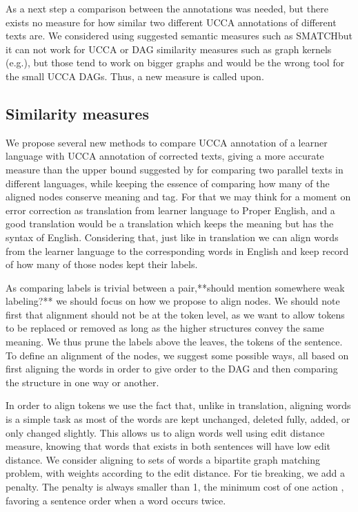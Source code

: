\documentclass[english]{article}
\begin{document}
As a next step a comparison between the annotations was needed, but
there exists no measure for how similar two different UCCA annotations
of different texts are. We considered using suggested semantic measures
such as SMATCH\cite{cai2013smatch}but it can not work for UCCA or
DAG similarity measures such as graph kernels (e.g.\cite{kashima2003marginalized}),
but those tend to work on bigger graphs and would be the wrong tool
for the small UCCA DAGs. Thus, a new measure is called upon.

\subsection{Similarity measures\label{subsec:Similarity-measures}}

We propose several new methods to compare UCCA annotation of a learner\\
language with UCCA annotation of corrected texts, giving a more accurate
measure than the upper bound suggested by \cite{sulem2015conceptual}for
comparing two parallel texts in different languages, while keeping
the essence of comparing how many of the aligned nodes conserve meaning
and tag. For that we may think for a moment on error correction as
translation from learner language to Proper English, and a good translation
would be a translation which keeps the meaning but has the syntax
of English. Considering that, just like in translation we can align
words from the learner language to the corresponding words in English
and keep record of how many of those nodes kept their labels.

As comparing labels is trivial between a pair,{*}{*}should mention
somewhere weak labeling?{*}{*} we should focus on how we propose to
align nodes. We should note first that alignment should not be at
the token level, as we want to allow tokens to be replaced or removed
as long as the higher structures convey the same meaning. We thus
prune the labels above the leaves, the tokens of the sentence. To
define an alignment of the nodes, we suggest some possible ways, all
based on first aligning the words in order to give order to the DAG
and then comparing the structure in one way or another.

In order to align tokens we use the fact that, unlike in translation,
aligning words is a simple task as most of the words are kept unchanged,
deleted fully, added, or only changed slightly. This allows us to
align words well using edit distance measure, knowing that words that
exists in both sentences will have low edit distance. We consider
aligning to sets of words a bipartite graph matching problem, with
weights according to the edit distance. For tie breaking, we add a
penalty. The penalty is always smaller than 1, the minimum cost of
one action , favoring a sentence order when a word occurs twice.
\end{document}
